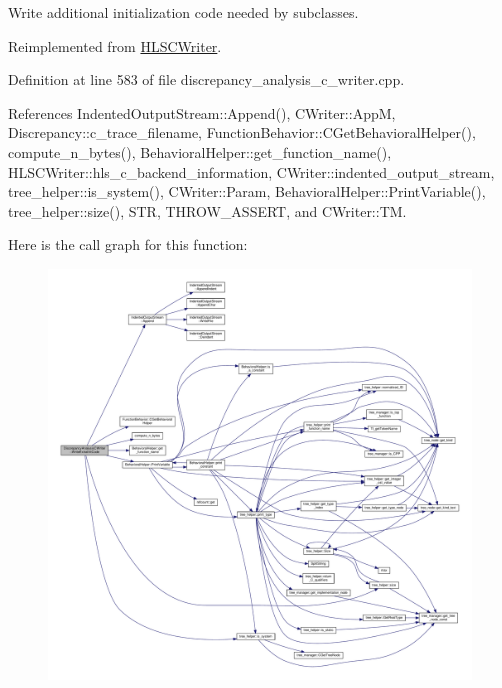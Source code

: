 Write additional initialization code needed by subclasses. 



Reimplemented from \hyperlink{classHLSCWriter_a05886037980c7ec5aa2df5880081682c}{H\+L\+S\+C\+Writer}.



Definition at line 583 of file discrepancy\+\_\+analysis\+\_\+c\+\_\+writer.\+cpp.



References Indented\+Output\+Stream\+::\+Append(), C\+Writer\+::\+AppM, Discrepancy\+::c\+\_\+trace\+\_\+filename, Function\+Behavior\+::\+C\+Get\+Behavioral\+Helper(), compute\+\_\+n\+\_\+bytes(), Behavioral\+Helper\+::get\+\_\+function\+\_\+name(), H\+L\+S\+C\+Writer\+::hls\+\_\+c\+\_\+backend\+\_\+information, C\+Writer\+::indented\+\_\+output\+\_\+stream, tree\+\_\+helper\+::is\+\_\+system(), C\+Writer\+::\+Param, Behavioral\+Helper\+::\+Print\+Variable(), tree\+\_\+helper\+::size(), S\+TR, T\+H\+R\+O\+W\+\_\+\+A\+S\+S\+E\+RT, and C\+Writer\+::\+TM.

Here is the call graph for this function\+:
\nopagebreak
\begin{figure}[H]
\begin{center}
\leavevmode
\includegraphics[width=350pt]{d4/d5c/classDiscrepancyAnalysisCWriter_a4372f752e67aea0e47542ee355932da2_cgraph}
\end{center}
\end{figure}
\mbox{\label{classDiscrepancyAnalysisCWriter_a190bda3bc90a238e772d319afd83becc}} 
